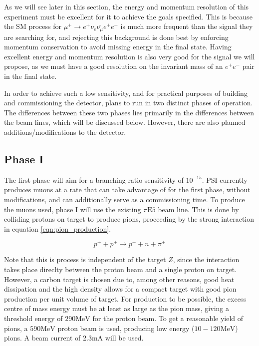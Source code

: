 As we will see later in this section, the energy and momentum resolution of this experiment must be excellent for it to achieve the goals specified.
This is because the SM process for $\mu^+ \rightarrow e^+ \nu_e \bar{\nu_\mu} e^+ e^-$ is much more frequent than the signal they are searching for, and rejecting this background is done best by enforcing momentum conservation to avoid missing energy in the final state.
Having excellent energy and momentum resolution is also very good for the signal we will propose, as we must have a good resolution on the invariant mass of an $e^+ e^-$ pair in the final state.

In order to achieve such a low sensitivity, and for practical purposes of building and commissioning the detector, \mueee plans to run in two distinct phases of operation.
The differences between these two phases lies primarily in the differences between the beam lines, which will be discussed below.
However, there are also planned additions/modifications to the detector.

\subsection{Phase I}
The first phase will aim for a branching ratio sensitivity of $10^{-15}$.
PSI currently produces muons at a rate that \mueee can take advantage of for the first phase, without modifications, and can additionally serve as a commissioning time.
To produce the muons used, phase I will use the existing $\pi\textrm{E5}$ beam line.
This is done by colliding protons on target to produce pions, proceeding by the strong interaction in equation \ref{eqn:pion_production}.

\begin{equation}
\label{eqn:pion_production}
p^+ + p^+ \rightarrow p^+ + n + \pi^+
\end{equation}

\noindent Note that this is process is independent of the target $Z$, since the interaction takes place direclty between the proton beam and a single proton on target.
However, a carbon target is chosen due to, among other reasons, good heat dissipation and the high density allows for a compact target with good pion production per unit volume of target.
For production to be possible, the excess centre of mass energy must be at least as large as the pion mass, giving a threshold energy of $290\textrm{MeV}$ for the proton beam.
To get a reasonable yield of pions, a $590\textrm{MeV}$ proton beam is used, producing low energy ($10-120\textrm{MeV}$) pions.
A beam current of $2.3\textrm{mA}$ will be used.

